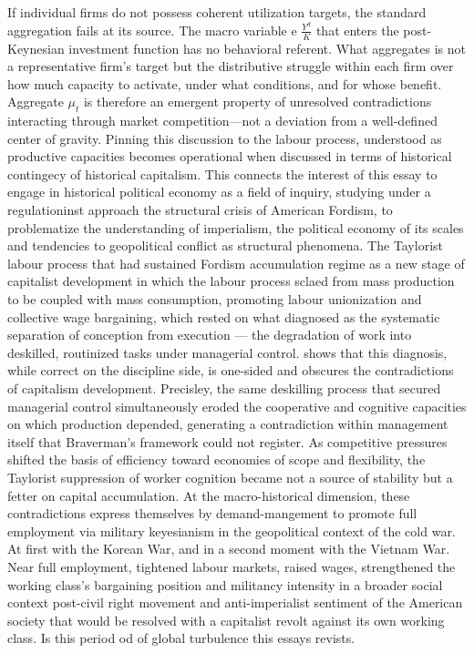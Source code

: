 \documentclass[11pt,a4paper]{article}
\begin{document}
If individual firms do not possess coherent utilization targets, the standard aggregation fails at its source. The macro variable e $\frac{Y^d}{K}$ that enters the post-Keynesian investment function has no behavioral referent. What aggregates is not a representative firm's target but the distributive struggle within each firm over how much capacity to activate, under what conditions, and for whose benefit. Aggregate $\mu_t$ is therefore an emergent property of unresolved contradictions interacting through market competition---not a deviation from a well-defined center of gravity. Pinning this discussion to the labour process, understood as productive capacities becomes operational when discussed in terms of historical contingecy of historical capitalism. This connects the interest of this essay to engage in historical political economy as a field of inquiry, studying under a regulationinst approach the structural crisis of American Fordism, to problematize the understanding of imperialism, the political economy of its scales and tendencies to geopolitical conflict as structural phenomena. The Taylorist labour process that had sustained Fordism accumulation regime as a new stage of capitalist development in which the labour process sclaed from mass production to be coupled with mass consumption, promoting labour unionization and collective wage bargaining, which rested on what \citet{Braverman1998} diagnosed as the systematic separation of conception from execution ---  the degradation of work into deskilled, routinized tasks under  managerial control. \citet{Vidal2022} shows that this diagnosis, while  correct on the discipline side, is one-sided and obscures the contradictions of capitalism development. Precisley, the same deskilling process that  secured managerial control simultaneously eroded the cooperative and  cognitive capacities on which production depended, generating a contradiction within management itself that Braverman's framework could not register. As competitive pressures shifted the basis of efficiency toward economies of scope and flexibility, the Taylorist suppression of worker cognition became not a source of stability but a fetter on 
capital accumulation. At the macro-historical dimension, these contradictions express themselves by demand-mangement to promote full employment via military keyesianism in the geopolitical context of the cold war. At first with the Korean War, and in a second moment with the Vietnam War. Near full employment, tightened labour markets, raised wages, strengthened the working class's bargaining position and militancy intensity in a broader social context post-civil right movement and anti-imperialist sentiment of the American society that would be resolved with a capitalist revolt against its own working class. Is this period od of global turbulence this essays revists. 
\end{document}
